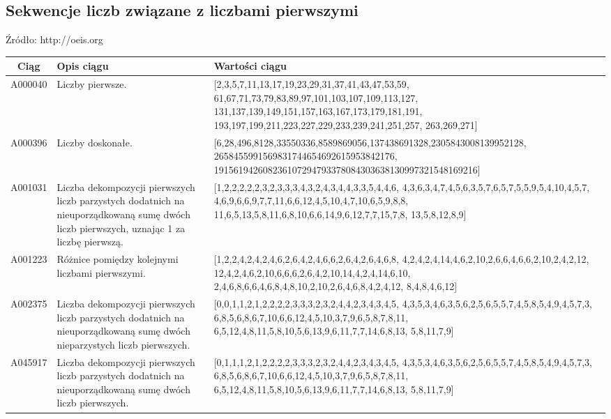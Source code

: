 \documentclass[10pt,onecolumn]{article}
\theoremstyle{definition}
\theoremstyle{hypothesis}
\theoremstyle{capability}
\begin{document}
\newpage


\begin{landscape}

\section{Sekwencje liczb związane z liczbami pierwszymi}

Źródło: http://oeis.org

\begin{tabularx}{\linewidth}{ |c|X|X| }
  \hline 
  \rowcolor{LightCyan}
  Ciąg & Opis ciągu & Wartości ciągu \\
  \hline
A000040 & Liczby pierwsze. &
[2,3,5,7,11,13,17,19,23,29,31,37,41,43,47,53,59,
 61,67,71,73,79,83,89,97,101,103,107,109,113,127,
 131,137,139,149,151,157,163,167,173,179,181,191,
 193,197,199,211,223,227,229,233,239,241,251,257,
 263,269,271] \\
  \hline
A000396 & Liczby doskonałe. &
[6,28,496,8128,33550336,8589869056,137438691328,2305843008139952128,
 2658455991569831744654692615953842176,
 191561942608236107294793378084303638130997321548169216] \\
  \hline
A001031 & Liczba dekompozycji pierwszych liczb parzystych dodatnich na nieuporządkowaną sumę dwóch liczb pierwszych, uznając 1 za liczbę pierwszą. & 
[1,2,2,2,2,2,3,2,3,3,3,4,3,2,4,3,4,4,3,3,5,4,4,6,
 4,3,6,3,4,7,4,5,6,3,5,7,6,5,7,5,5,9,5,4,10,4,5,7,
 4,6,9,6,6,9,7,7,11,6,6,12,4,5,10,4,7,10,6,5,9,8,8,
 11,6,5,13,5,8,11,6,8,10,6,6,14,9,6,12,7,7,15,7,8,
 13,5,8,12,8,9] \\
  \hline
A001223 & Różnice pomiędzy kolejnymi liczbami pierwszymi. & 
[1,2,2,4,2,4,2,4,6,2,6,4,2,4,6,6,2,6,4,2,6,4,6,8,
 4,2,4,2,4,14,4,6,2,10,2,6,6,4,6,6,2,10,2,4,2,12,
 12,4,2,4,6,2,10,6,6,6,2,6,4,2,10,14,4,2,4,14,6,10,
 2,4,6,8,6,6,4,6,8,4,8,10,2,10,2,6,4,6,8,4,2,4,12,
 8,4,8,4,6,12] \\
  \hline
A002375 & Liczba dekompozycji pierwszych liczb parzystych dodatnich na nieuporządkowaną sumę dwóch nieparzystych liczb pierwszych. & 
[0,0,1,1,2,1,2,2,2,2,3,3,3,2,3,2,4,4,2,3,4,3,4,5,
 4,3,5,3,4,6,3,5,6,2,5,6,5,5,7,4,5,8,5,4,9,4,5,7,3,
 6,8,5,6,8,6,7,10,6,6,12,4,5,10,3,7,9,6,5,8,7,8,11,
 6,5,12,4,8,11,5,8,10,5,6,13,9,6,11,7,7,14,6,8,13,
 5,8,11,7,9] \\
  \hline
A045917 & Liczba dekompozycji pierwszych liczb parzystych dodatnich na nieuporządkowaną sumę dwóch liczb pierwszych. & 
[0,1,1,1,2,1,2,2,2,2,3,3,3,2,3,2,4,4,2,3,4,3,4,5,
 4,3,5,3,4,6,3,5,6,2,5,6,5,5,7,4,5,8,5,4,9,4,5,7,3,
 6,8,5,6,8,6,7,10,6,6,12,4,5,10,3,7,9,6,5,8,7,8,11,
 6,5,12,4,8,11,5,8,10,5,6,13,9,6,11,7,7,14,6,8,13,
 5,8,11,7,9] \\
  \hline
\end{tabularx}

\end{landscape}
\end{document}
